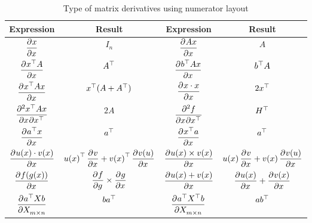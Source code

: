 \begin{table}[H]
\centering
\renewcommand*{\arraystretch}{2.5}
\begin{tabular}[t]{|c|c|c|c|}
\hline
Expression & Result & Expression & Result \\ \hline
$\dpd{{x}}{{x}}$ & $I_n$ & $\dpd{A {x}}{{x}}$ & $A$\\[1ex] \hline
$\dpd{\transpose{{x}}A}{{x}}$ & ${A}^\top$ & $\dpd{\transpose{b}A {x}}{{x}}$ & ${b}^\top A$ \\[1ex]  \hline
$\dpd{\transpose{{x}}A {x}}{{x}}$ & $ {{x}}^\top(A + {A}^\top)$ & $\dpd{x \cdot x}{{x}}$ & $ 2{{x}}^\top$ \\[1ex]  \hline
$\dmd{{\transpose{{x}}A {x}}}{2}{{x}}{}{{\transpose{{x}}}}{}$ & $2A$ & $\dmd{f}{2}{{x}}{}{{\transpose{{x}}}}{}$ & ${H}^\top$  \\[1ex]  \hline
$\dpd{\transpose{a}x}{x}$ & ${a}^\top$ & $\dpd{\transpose{x}a}{x}$ & ${a}^\top$  \\[1ex]  \hline
$\dpd{u(x) \cdot v(x)}{x}$ & $\transpose{u(x)} \dpd{v}{x} + \transpose{v(x)} \dpd{v(u)}{x}$ & $\dpd{u(x) \times v(x)}{x}$ & $u(x) \dpd{v}{x} + v(x) \dpd{v(u)}{x}$  \\[1ex]  \hline
$\dpd{f(g(x))}{x}$ & $\dpd{f}{g} \times \dpd{g}{x}$ & $\dpd{u(x) + v(x)}{x}$ & $\dpd{u(x)}{x} + \dpd{v(x)}{x}$ \\[1ex]  \hline
$\dpd{\transpose{a}X b}{X_{m \times n}}$ & $b {a}^\top$ & $\dpd{\transpose{a} \transpose{X} b}{X_{m \times n}}$ & $a {b}^\top$ \\[1ex]  \hline
\end{tabular}

\caption{Type of matrix derivatives using numerator layout}
\end{table}





























